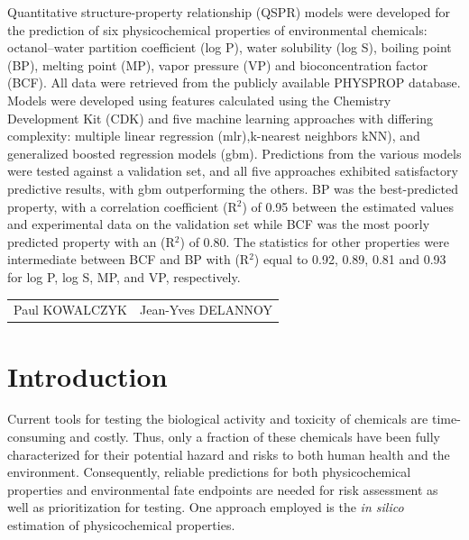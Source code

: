 \documentclass[10pt, letter]{article}
\renewcommand{\=}{\, =\, }
\newcommand{\+}{\, +\, }
\renewcommand{\-}{\, -\, }
\begin{document}
Quantitative structure-property relationship (QSPR) models were developed for the
prediction of six physicochemical properties of environmental chemicals: octanol–water
partition coefficient (log P), water solubility (log S), boiling point (BP), melting point (MP),
vapor pressure (VP) and bioconcentration factor (BCF). All data were retrieved from the publicly available PHYSPROP database. Models were developed using
features calculated using the Chemistry Development Kit (CDK) and five machine learning approaches with differing complexity: multiple
linear regression (mlr),k-nearest neighbors kNN), and generalized boosted regression models (gbm). Predictions from the various models were tested
against a validation set, and all five approaches exhibited satisfactory predictive results, with
gbm outperforming the others. BP was the best-predicted property, with a correlation
coefficient (R\(^{2}\)) of 0.95 between the estimated values and experimental data on the
validation set while BCF was the most poorly predicted property with an (R\(^{2}\)) of 0.80. The
statistics for other properties were intermediate between BCF and BP with (R\(^{2}\)) equal to 0.92,
0.89, 0.81 and 0.93 for log P, log S, MP, and VP, respectively.  

\vspace*{1cm}
\begin{tabular*}{5.03\textwidth}{lr}
Paul KOWALCZYK &\hspace*{9cm} Jean-Yves DELANNOY\\
\end{tabular*}

\newpage

\tableofcontents

\newpage

\section{Introduction}

Current tools for testing the biological activity and toxicity of chemicals are
time-consuming and costly. Thus, only a fraction of these chemicals have been
fully characterized for their potential hazard and risks to both human health and
the environment. Consequently, 
reliable predictions for both physicochemical properties and environmental fate endpoints are needed for risk assessment as well as
prioritization for testing. One approach employed is the \textit{in silico} estimation of physicochemical properties.
\end{document}
